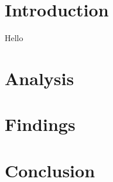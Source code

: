 \documentclass[cm, 10pt]{article}
\begin{document}
  \section{Introduction}
    Hello


  \section{Analysis}


  \section{Findings}


  \section{Conclusion}

\end{document}
